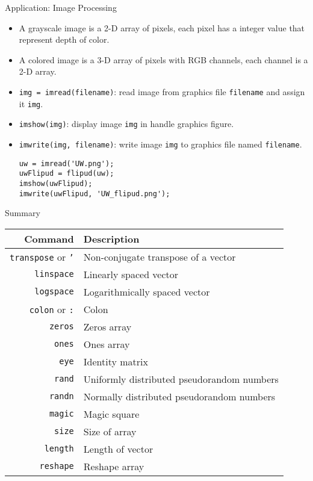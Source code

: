 \begin{frame}[fragile]{Application: Image Processing}
\protect\hypertarget{application-image-processing}{}
\begin{itemize}[<+->]
\item
  A grayscale image is a 2-D array of pixels, each pixel has a integer
  value that represent depth of color.
\item
  A colored image is a 3-D array of pixels with RGB channels, each
  channel is a 2-D array.
\item
  \texttt{img\ =\ imread(filename)}: read image from graphics file
  \texttt{filename} and assign it \texttt{img}.
\item
  \texttt{imshow(img)}: display image \texttt{img} in handle graphics
  figure.
\item
  \texttt{imwrite(img,\ filename)}: write image \texttt{img} to graphics
  file named \texttt{filename}.

\begin{verbatim}
uw = imread('UW.png');
uwFlipud = flipud(uw);
imshow(uwFlipud);
imwrite(uwFlipud, 'UW_flipud.png');
\end{verbatim}
\end{itemize}
\end{frame}

\begin{frame}{Summary}
\protect\hypertarget{summary}{}
\begin{table}[!hbtp]
  \begin{tabular}{rl}
    Command                          & Description \\
    \hline
    \texttt{transpose} or \texttt{'} & Non-conjugate transpose of a vector \\
    \texttt{linspace}                & Linearly spaced vector \\
    \texttt{logspace}                & Logarithmically spaced vector \\
    \texttt{colon} or \texttt{:}     & Colon \\
    \texttt{zeros}                   & Zeros array \\
    \texttt{ones}                    & Ones array \\
    \texttt{eye}                     & Identity matrix \\
    \texttt{rand}                    & Uniformly distributed pseudorandom numbers \\
    \texttt{randn}                   & Normally distributed pseudorandom numbers \\
    \texttt{magic}                   & Magic square \\
    \texttt{size}                    & Size of array \\
    \texttt{length}                  & Length of vector \\
    \texttt{reshape}                 & Reshape array \\
  \end{tabular}
\end{table}
\end{frame}

